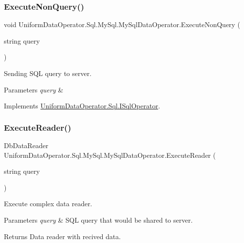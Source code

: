 \subsubsection{\texorpdfstring{Execute\+Non\+Query()}{ExecuteNonQuery()}}
{\footnotesize\ttfamily void Uniform\+Data\+Operator.\+Sql.\+My\+Sql.\+My\+Sql\+Data\+Operator.\+Execute\+Non\+Query (\begin{DoxyParamCaption}\item[{string}]{query }\end{DoxyParamCaption})}



Sending S\+QL query to server. 


\begin{DoxyParams}{Parameters}
{\em query} & \\
\hline
\end{DoxyParams}


Implements \mbox{\hyperlink{interface_uniform_data_operator_1_1_sql_1_1_i_sql_operator_a94a133a152ee1f509bcb049c7175c445}{Uniform\+Data\+Operator.\+Sql.\+I\+Sql\+Operator}}.

\mbox{\label{class_uniform_data_operator_1_1_sql_1_1_my_sql_1_1_my_sql_data_operator_af268707ebe1917b32e450fb0f50e717d}} 
\subsubsection{\texorpdfstring{Execute\+Reader()}{ExecuteReader()}}
{\footnotesize\ttfamily Db\+Data\+Reader Uniform\+Data\+Operator.\+Sql.\+My\+Sql.\+My\+Sql\+Data\+Operator.\+Execute\+Reader (\begin{DoxyParamCaption}\item[{string}]{query }\end{DoxyParamCaption})}



Execute complex data reader. 


\begin{DoxyParams}{Parameters}
{\em query} & S\+QL query that would be shared to server.\\
\hline
\end{DoxyParams}
\begin{DoxyReturn}{Returns}
Data reader with recived data.
\end{DoxyReturn}



